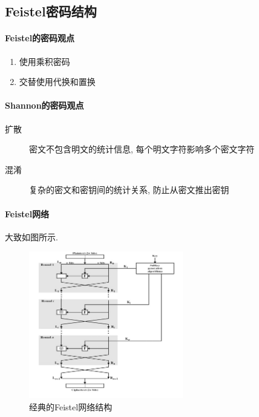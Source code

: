\documentclass{ctexart}
\begin{document}

\subsection{Feistel密码结构}
\paragraph{Feistel的密码观点}
    \begin{enumerate}
        \item 使用乘积密码
        \item 交替使用代换和置换
    \end{enumerate}
\paragraph{Shannon的密码观点}
    \begin{description}
        \item[扩散] 密文不包含明文的统计信息, 每个明文字符影响多个密文字符
        \item[混淆] 复杂的密文和密钥间的统计关系, 防止从密文推出密钥
    \end{description}
\paragraph{Feistel网络}
    大致如图所示.
    \begin{figure}[ht]
    \vskip 0.2in
    \begin{center}
    \centerline{\includegraphics[width=0.6\textwidth]{feistel-net}}
    \caption{经典的Feistel网络结构}
    \label{lenet-structure}
    \end{center}
    \vskip -0.2in
    \end{figure}
\end{document}
